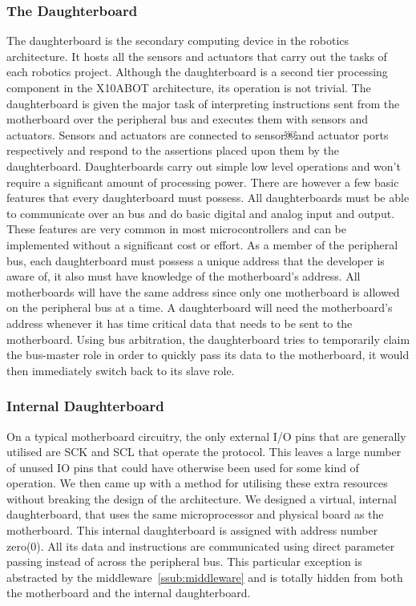 	\subsubsection{The Daughterboard} %
	\label{ssub:the_daughterboard}
	The daughterboard is the secondary computing device in the \xten robotics architecture. It hosts all the sensors and actuators that carry out the tasks of each robotics project. Although the daughterboard is a second tier processing component in the X10ABOT architecture, its operation is not trivial. The daughterboard is given the major task of interpreting instructions sent from the motherboard over the peripheral bus and executes them with sensors and actuators. Sensors and actuators are connected to sensor￼and actuator ports respectively and respond to the assertions placed upon them by the daughterboard. Daughterboards carry out simple low level operations and won't require a significant amount of processing power. There are however a few basic features that every daughterboard must possess. All daughterboards must be able to communicate over an \iic bus and do basic digital and analog input and output. These features are very common in most microcontrollers and can be implemented without a significant cost or effort.
	As a member of the peripheral bus, each daughterboard must possess a unique address that the developer is aware of, it also must have knowledge of the motherboard's address. All motherboards will have the same address since only one motherboard is allowed on the peripheral bus at a time. A daughterboard will need the motherboard's address whenever it has time critical data that needs to be sent to the motherboard. Using bus arbitration, the daughterboard tries to temporarily claim the bus-master role in order to quickly pass its data to the motherboard, it would then immediately switch back to its slave role.
	\subsubsection{Internal Daughterboard} %
	\label{ssub:internal_daughterboard}
	
	On a typical motherboard circuitry, the only external I/O pins that are generally utilised are SCK and SCL that operate the \iic protocol. This leaves a large number of unused IO pins that could have otherwise been used for some kind of operation. We then came up with a method for utilising these extra resources without breaking the design of the architecture. We designed a virtual, internal daughterboard, that uses the same microprocessor and physical board as the motherboard. This internal daughterboard is assigned with address number zero(0). All its data and instructions are communicated using direct parameter passing instead of across the peripheral bus. This particular exception is abstracted by the middleware~\ref{ssub:middleware} and is totally hidden from both the motherboard and the internal daughterboard.
	
